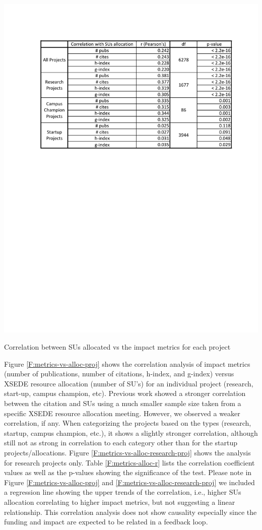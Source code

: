 \documentclass{sig-alternate}
\begin{document}
\begin{table}[!htb] 
  \centering 
    \includegraphics[width=1.0\columnwidth]{images/metrics_alloc_r.pdf} 
  \caption{Correlation between SUs allocated vs the impact metrics for each project}\label{F:metrics-alloc-r} 
\end{table} 
 
Figure \ref{F:metrics-vs-alloc-proj} shows the correlation analysis of impact metrics (number of publications, number of citations, h-index, and g-index) versus XSEDE resource allocation (number of SU's) for an individual project (research, start-up, campus champion, etc).  Previous work showed a stronger correlation between the citation and SUs \cite{bollen2011and} using a much smaller sample size taken from a specific XSEDE resource allocation meeting. However, we observed a weaker correlation, if any. When categorizing the projects based on the types (research, startup, campus champion, etc.), it shows a slightly stronger correlation,  although still not as strong in correlation to each category other than for the startup projects/allocations. Figure \ref{F:metrics-vs-alloc-research-proj} shows the analysis for research projects only. Table \ref{F:metrics-alloc-r} lists the correlation coefficient values as well as the p-values showing the significance of the test. Please note in Figure \ref{F:metrics-vs-alloc-proj} and \ref{F:metrics-vs-alloc-research-proj} we included a regression line showing the upper trends of the correlation, i.e., higher SUs allocation correlating to higher impact metrics, but not suggesting a linear relationship. This correlation analysis does not show causality especially since the funding and impact are expected to be related in a feedback loop. 
 
\end{document}
